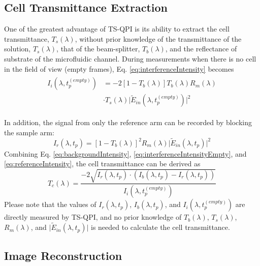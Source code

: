 \documentclass[aps,pra,reprint,superscriptaddress]{revtex4-1}
\begin{document}
\subsection{Cell Transmittance Extraction} \label{scn:transmittance}
One of the greatest advantage of TS-QPI is its ability to extract the cell transmittance, $T_s(\lambda)$, without prior knowledge of the transmittance of the solution, $T_s(\lambda)$, that of the beam-splitter, $T_b(\lambda)$, and the reflectance of substrate of the microfluidic channel. During measurements when there is no cell in the field of view (empty frames), Eq. \ref{eq:interferenceIntensity} becomes
\begin{align}
\begin{split} \label{eq:interferenceIntensityEmpty}
I_i (\lambda, t_p^{(empty)}) &= - 2 [1-T_b(\lambda)] T_b(\lambda) R_m(\lambda)\\
& \cdot T_s(\lambda) \lvert \tilde{E}_{in}(\lambda, t_p^{(empty)})\rvert^2
\end{split}
\end{align}

In addition, the signal from only the reference arm can be recorded by blocking the sample arm:
\begin{equation} \label{eq:referenceIntensity}
I_r (\lambda, t_p) = [1-T_b(\lambda)]^2 R_m(\lambda) \lvert\tilde{E}_{in}(\lambda, t_p)\rvert^2
\end{equation}
Combining Eq. \ref{eq:backgroundIntensity}, \ref{eq:interferenceIntensityEmpty}, and \ref{eq:referenceIntensity}, the cell transmittance can be derived as
\begin{equation}
T_c(\lambda) = \frac{-2\sqrt{I_r (\lambda, t_p) \cdot (I_b (\lambda, t_p) - I_r (\lambda, t_p))}}{I_i (\lambda, t_p^{(empty)})}
\end{equation}
Please note that the values of $I_r (\lambda, t_p)$, $I_b (\lambda, t_p)$, and $I_i (\lambda, t_p^{(empty)})$ are directly measured by TS-QPI, and no prior knowledge of $T_b(\lambda)$, $T_s(\lambda)$, $R_m(\lambda)$, and $\lvert \tilde{E}_{in}(\lambda, t_p)\rvert$ is needed to calculate the cell transmittance.

\subsection{Image Reconstruction}
\end{document}
